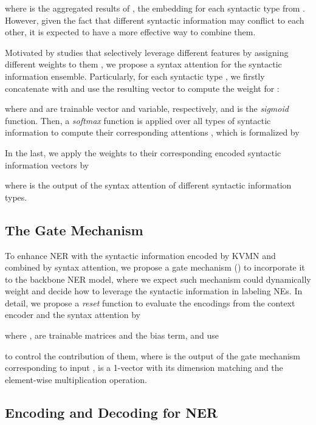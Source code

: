 \documentclass[11pt,a4paper]{article}
\begin{document}
where
 is the aggregated results of , the embedding for each syntactic type from .
However, given the fact that different syntactic information may conflict to each other, it is expected to have a more effective way to combine them.


Motivated by studies that selectively leverage different features by assigning different weights to them \cite{kumar-etal-2018-knowledge,higashiyama-etal-2019-incorporating,tian-etal-2020-joint,tian-etal-2020-suppertagging},
we propose a syntax attention for the syntactic information ensemble.
Particularly,
for each syntactic type , we firstly concatenate  with  and use the resulting vector to compute the weight  for :

where  and  are trainable vector and variable, respectively, and  is the \textit{sigmoid} function.
Then, a \textit{softmax} function is applied over all types of syntactic information to compute their corresponding attentions , which is formalized by

In the last, we apply the weights to their corresponding encoded syntactic information vectors by

where  is the output of the syntax attention of different syntactic information types.




\subsection{The Gate Mechanism}

To enhance NER with
the syntactic information encoded by KVMN and combined by syntax attention,
we propose a gate mechanism () to incorporate it to the backbone NER model,
where we expect such mechanism could dynamically weight and decide how to leverage the syntactic information in labeling NEs.
In detail,
we propose 
a \textit{reset} function  to evaluate the encodings from the context encoder and the syntax attention by

where ,  are trainable matrices and  the bias term,
and use

to control the contribution of them,
where  is the output of the gate mechanism corresponding to input ,
 is a 1-vector with its dimension matching  and  the element-wise multiplication operation.


\subsection{Encoding and Decoding for NER}
\end{document}
